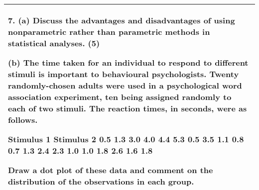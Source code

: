 \documentclass[a4paper,12pt]{article}
\begin{document}
\begin{table}[ht!]
 
\centering
 
\begin{tabular}{|p{15cm}|}
 
\hline  

7. (a) Discuss the advantages and disadvantages of using nonparametric rather than parametric methods in statistical analyses. (5) 
 
 (b) The time taken for an individual to respond to different stimuli is important to behavioural psychologists.  Twenty randomly-chosen adults were used in a psychological word association experiment, ten being assigned randomly to each of two stimuli.  
The reaction times, in seconds, were as follows. 
 
Stimulus 1 Stimulus 2 0.5 1.3 3.0 4.0 4.4 5.3 0.5 3.5 1.1 0.8 0.7 1.3 2.4 2.3 1.0 1.0 1.8 2.6 1.6 1.8 
 
 
 
Draw a dot plot of these data and comment on the distribution of the observations in each group.  
\\ \hline
  
\end{tabular}

\end{table}





        
\end{document}
